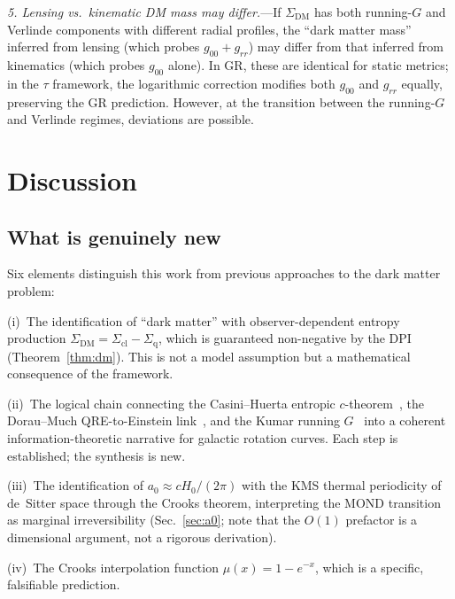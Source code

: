 \documentclass[prd,twocolumn,superscriptaddress,longbibliography,floatfix]{revtex4-2}
\newcommand{\tauasym}{\tau}
\begin{document}
\emph{5. Lensing vs.\ kinematic DM mass may differ.}---If
$\Sigma_{\mathrm{DM}}$ has both running-$G$ and Verlinde
components with different radial profiles, the
``dark matter mass'' inferred from lensing (which probes
$g_{00} + g_{rr}$) may differ from that inferred from
kinematics (which probes $g_{00}$ alone).  In GR, these are
identical for static metrics; in the $\tauasym$ framework,
the logarithmic correction modifies both $g_{00}$ and
$g_{rr}$ equally, preserving the GR prediction.
However, at the transition between the running-$G$ and
Verlinde regimes, deviations are possible.

\section{Discussion}
\label{sec:discussion}

\subsection{What is genuinely new}

Six elements distinguish this work from previous
approaches to the dark matter problem:

(i)~The identification of ``dark matter'' with
observer-dependent entropy production
$\Sigma_{\mathrm{DM}} = \Sigma_{\mathrm{cl}} -
\Sigma_{\mathrm{q}}$, which is guaranteed non-negative by
the DPI (Theorem~\ref{thm:dm}).  This is not a model
assumption but a mathematical consequence of the framework.

(ii)~The logical chain connecting the Casini--Huerta
entropic $c$-theorem~\cite{CasiniHuerta2012,CasiniHuerta2017},
the Dorau--Much QRE-to-Einstein link~\cite{DorauMuch2025},
and the Kumar running $G$~\cite{Kumar2025} into a coherent
information-theoretic narrative for galactic rotation curves.
Each step is established; the synthesis is new.

(iii)~The identification of $a_0 \approx cH_0/(2\pi)$ with the
KMS thermal periodicity of de~Sitter space through the Crooks
theorem, interpreting the MOND transition as marginal
irreversibility (Sec.~\ref{sec:a0}; note that the $O(1)$
prefactor is a dimensional argument, not a rigorous
derivation).

(iv)~The Crooks interpolation function $\mu(x) = 1 - e^{-x}$,
which is a specific, falsifiable prediction.
\end{document}

